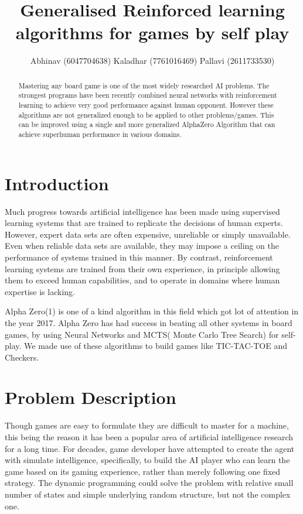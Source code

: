 \documentclass{article}
\title{Generalised Reinforced learning algorithms for games by self play}
\author{
    Abhinav (6047704638) \And
    Kaladhar (7761016469) \And
    Pallavi (2611733530)
}
\begin{document}
\maketitle

\begin{abstract}
  Mastering any board game is one of the most widely researched AI problems. The strongest programs have been recently combined neural networks with reinforcement learning to achieve very good performance against human opponent. However these algorithms are not generalized enough to be applied to other problems/games. This can be improved using a single and more generalized AlphaZero Algorithm that can achieve superhuman performance in various domains.
\end{abstract}

\section{Introduction}
    Much progress towards artificial intelligence has been made using supervised learning systems that are trained to replicate the decisions of human experts. However, expert data sets are often expensive, unreliable or simply unavailable. Even when reliable data sets are available, they may impose a ceiling on the performance of systems trained in this manner. By contrast, reinforcement learning systems are trained from their own experience, in principle allowing them to exceed human capabilities, and to operate in domains where human expertise is lacking.
    
    Alpha Zero(1) is one of a kind algorithm in this field which got lot of attention in the year 2017. Alpha Zero has had success in beating all other systems in board games, by using Neural Networks and MCTS( Monte Carlo Tree Search) for self-play. We made use of these algorithms to build games like TIC-TAC-TOE and Checkers.


\section{Problem Description}


Though games are easy to  formulate they are difficult to master for a machine, this being the reason it has been a popular area of artificial intelligence research for a long time. For decades, game developer have attempted to create the agent with simulate intelligence, specifically, to build the AI player who can learn the game based on its gaming experience, rather than merely following one fixed strategy. The dynamic programming could solve the problem with relative small number of states and simple underlying random structure, but not the complex one.
\end{document}
